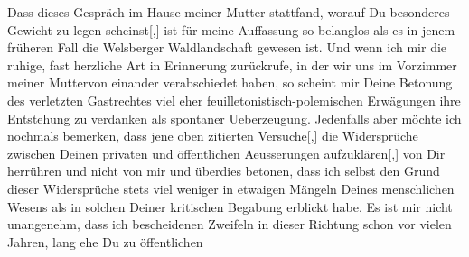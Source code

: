 \pstart
           {\pb}Dass dieses Gespräch im Hause meiner Mutter stattfand, worauf Du
               besonderes Gewicht zu legen scheinst{[},{]} ist für meine Auffassung
               so belanglos als es in jenem früheren Fall die Welsberger Waldlandschaft gewesen ist. Und wenn ich mir die ruhige, fast
               herzliche Art in Erinnerung zurückrufe, in der wir uns im Vorzimmer meiner Mutter\introOben{}von einander\introOben{} verabschiedet haben, so scheint mir Deine
               Betonung des verletzten Gastrechtes viel eher feuilletoni\introOben{}sti\introOben{}sch-polemischen Erwägungen ihre Entstehung zu verdanken als spontaner
               Ueberzeugung. Jedenfalls aber möchte ich nochmals bemerken, dass jene oben zitierten
                  Versuche{[},{]} die Widersprüche zwischen Deinen privaten und
               öffentlichen Aeusserungen aufzuklären{[},{]} von Dir herrühren und nicht
               von mir und überdies betonen, dass ich selbst den Grund dieser Widersprüche stets
               viel weniger in etwaigen Mängeln Deines menschlichen Wesens als in solchen Deiner
               kritischen Begabung erblickt habe. Es ist mir nicht unangenehm, dass ich bescheidenen
               Zweifeln in dieser Richtung schon vor vielen Jahren, lang ehe Du zu öffentlichen
